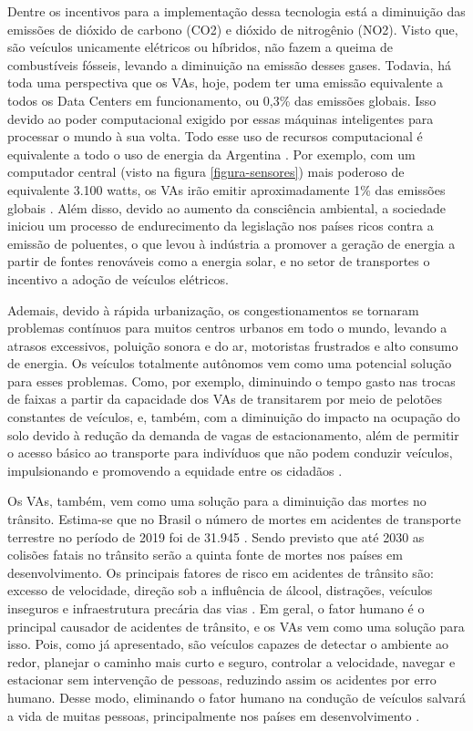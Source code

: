 \documentclass[
	12pt,				%
	openany, %
	a4paper,			%
	english,			%
	french,				%
	spanish,			%
	brazil				%
	]{abntex2}
\begin{document}
Dentre os incentivos para a implementação dessa tecnologia está a diminuição das emissões de dióxido de carbono (CO2) e dióxido de nitrogênio (NO2). Visto que, são veículos unicamente elétricos ou híbridos, não fazem a queima de combustíveis fósseis, levando a diminuição na emissão desses gases. Todavia, há toda uma perspectiva que os VAs, hoje, podem ter uma emissão equivalente a todos os Data Centers em funcionamento, ou 0,3\% das emissões globais. Isso devido ao poder computacional exigido por essas máquinas inteligentes para processar o mundo à sua volta. Todo esse uso de recursos computacional é equivalente a todo o uso de energia da Argentina \cite{intro-pm}. Por exemplo, com um computador central (visto na figura \ref{figura-sensores}) mais poderoso de equivalente 3.100 watts, os VAs irão emitir aproximadamente 1\% das emissões globais \cite{intro-pm}.
Além disso, devido ao aumento da consciência ambiental, a sociedade iniciou um processo de endurecimento da legislação nos países ricos contra a emissão de poluentes, o que levou à indústria a promover a geração de energia a partir de fontes renováveis como a energia solar, e no setor de transportes o incentivo a adoção de veículos elétricos.

Ademais, devido à rápida urbanização, os congestionamentos se tornaram problemas contínuos para muitos centros urbanos em todo o mundo, levando a atrasos excessivos, poluição sonora e do ar, motoristas frustrados e alto consumo de energia. Os veículos totalmente autônomos vem como uma potencial solução para esses problemas. Como, por exemplo, diminuindo o tempo gasto nas trocas de faixas a partir da capacidade dos VAs de transitarem por meio de pelotões constantes de veículos, e, também, com a diminuição do impacto na ocupação do solo devido à redução da demanda de vagas de estacionamento, além de permitir o acesso básico ao transporte para indivíduos que não podem conduzir veículos, impulsionando e promovendo a equidade entre os cidadãos \cite{conge}.

Os VAs, também, vem como uma solução para a diminuição das mortes no trânsito. Estima-se que no Brasil o número de mortes em acidentes de transporte terrestre no período de 2019 foi de 31.945 \cite{Anexo_I_pnatrans}. Sendo previsto que até 2030 as colisões fatais no trânsito serão a quinta fonte de mortes nos países em desenvolvimento. 
Os principais fatores de risco em acidentes de trânsito são: excesso de velocidade, direção sob a influência de álcool, distrações, veículos inseguros e infraestrutura precária das vias \cite{review-auto}.
Em geral, o fator humano é o principal causador de acidentes de trânsito, e os VAs vem como uma solução para isso. Pois, como já apresentado, são veículos capazes de detectar o ambiente ao redor, planejar o caminho mais curto e seguro, controlar a velocidade, navegar e estacionar sem intervenção de pessoas, reduzindo assim os acidentes por erro humano.
Desse modo, eliminando o fator humano na condução de veículos salvará a vida de muitas pessoas, principalmente nos países em desenvolvimento \cite{mundobrasil}. 
\end{document}
